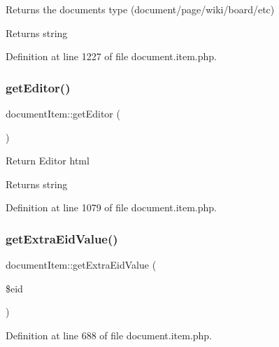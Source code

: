 Returns the document\textquotesingle{}s type (document/page/wiki/board/etc) \begin{DoxyReturn}{Returns}
string 
\end{DoxyReturn}


Definition at line 1227 of file document.\+item.\+php.

\hypertarget{classdocumentItem_a26477197e85301bc88e35157fdcb7482}{}\label{classdocumentItem_a26477197e85301bc88e35157fdcb7482} 
\subsubsection{\texorpdfstring{get\+Editor()}{getEditor()}}
{\footnotesize\ttfamily document\+Item\+::get\+Editor (\begin{DoxyParamCaption}{ }\end{DoxyParamCaption})}

Return Editor html \begin{DoxyReturn}{Returns}
string 
\end{DoxyReturn}


Definition at line 1079 of file document.\+item.\+php.

\hypertarget{classdocumentItem_a9c2574375684cd06a16532744e279c65}{}\label{classdocumentItem_a9c2574375684cd06a16532744e279c65} 
\subsubsection{\texorpdfstring{get\+Extra\+Eid\+Value()}{getExtraEidValue()}}
{\footnotesize\ttfamily document\+Item\+::get\+Extra\+Eid\+Value (\begin{DoxyParamCaption}\item[{}]{\$eid }\end{DoxyParamCaption})}



Definition at line 688 of file document.\+item.\+php.

\hypertarget{classdocumentItem_a52091af79c2df80f8f3c75e37adc2000}{}\label{classdocumentItem_a52091af79c2df80f8f3c75e37adc2000} 
